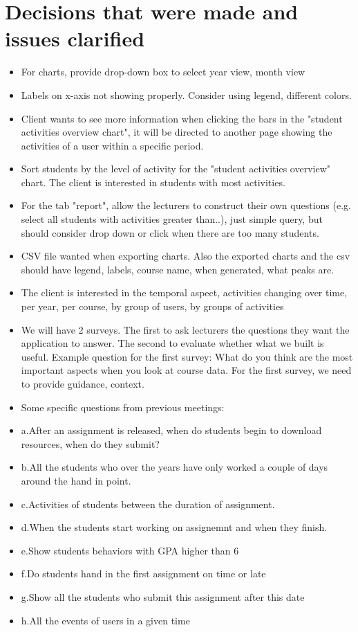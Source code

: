 \documentclass[11pt, a4paper]{article}
\begin{document}
\section{Decisions that were made and issues clarified}
\begin{itemize}
	\item For charts, provide drop-down box to select year view, month view
	\item Labels on x-axis not showing properly. Consider using legend, different colors.
	\item Client wants to see more information when clicking the bars in the "student activities overview chart", it will be directed to another page showing the activities of a user within a specific period.
	\item Sort students by the level of activity for the 
"student activities overview" chart. The client is interested in students with most activities.
	\item For the tab "report", allow the lecturers to construct their own questions (e.g. select all students with activities greater than..), just simple query, but should consider drop down or click when there are too many students.
	\item CSV file wanted when exporting charts. Also the exported charts and the csv should have legend, labels, course name, when generated, what peaks are.
	\item The client is interested in the temporal aspect, activities changing over time, per year, per course, by group of users, by groups of activities
		\item We will have 2 surveys. The first to ask lecturers the questions they want the application to answer. The second to evaluate whether what we built is useful. Example question for the first survey: What do you think are the most important aspects when you look at course data. For the first survey, we need to provide guidance, context.
	\item Some specific questions from previous meetings:
	\item a.After an assignment is released, when do students begin to download resources, when do they submit?
	\item b.All the students who over the years have only worked a couple of days around the hand in point.
	\item c.Activities of students between the duration of assignment.
	\item  d.When the students start working on assignemnt and when they finish.
	\item e.Show students behaviors with GPA higher than 6
	\item f.Do students hand in the first assignment on time or late
	\item g.Show all the students who submit this assignment after this date
	\item h.All the events of users in a given time

\end{itemize}
\end{document}
